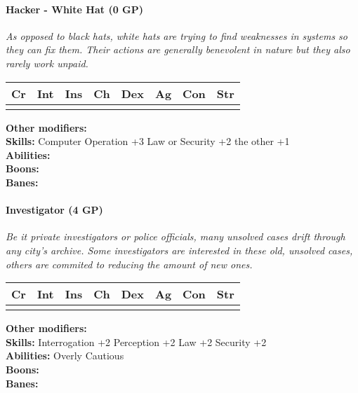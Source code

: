\documentclass[12pt,a4paper,openany]{book}
\begin{document}
	\paragraph*{Hacker - White Hat (0 GP)}
	\textit{As opposed to black hats, white hats are trying to find weaknesses in systems so they can fix them. Their actions are generally benevolent in nature but they also rarely work unpaid.}\par
	\begin{tabular}{|l|l|l|l|l|l|l|l|}
		\hline
		Cr & Int & Ins & Ch & Dex & Ag & Con & Str \\ \hline
		&  &  &  &  &  &  &  \\ \hline
	\end{tabular}\par
	\noindent\textbf{Other modifiers:} \\
	\textbf{Skills:} Computer Operation +3
	Law or Security +2
	the other +1\\
	\textbf{Abilities:} \\
	\textbf{Boons:} \\
	\textbf{Banes:} \\
	
	\hrulefill
	\paragraph*{Investigator (4 GP)}
	\textit{Be it private investigators or police officials, many unsolved cases drift through any city's archive. Some investigators are interested in these old, unsolved cases, others are commited to reducing the amount of new ones.}\par
	\begin{tabular}{|l|l|l|l|l|l|l|l|}
		\hline
		Cr & Int & Ins & Ch & Dex & Ag & Con & Str \\ \hline
		&  &  &  &  &  &  &  \\ \hline
	\end{tabular}\par
	\noindent\textbf{Other modifiers:} \\
	\textbf{Skills:} Interrogation +2
	Perception +2
	Law +2
	Security +2\\
	\textbf{Abilities:} Overly Cautious\\
	\textbf{Boons:} \\
	\textbf{Banes:} \\
	
	\hrulefill
\end{document}
